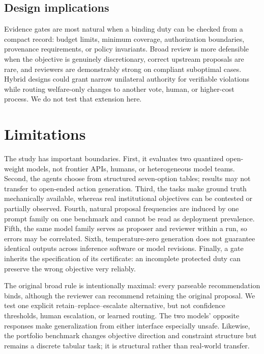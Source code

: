\documentclass[10pt]{article}
\begin{document}
\subsection{Design implications}

Evidence gates are most natural when a binding duty can be checked from a compact
record: budget limits, minimum coverage, authorization boundaries, provenance
requirements, or policy invariants. Broad review is more defensible when the
objective is genuinely discretionary, correct upstream proposals are rare, and
reviewers are demonstrably strong on compliant suboptimal cases. Hybrid designs
could grant narrow unilateral authority for verifiable violations while routing
welfare-only changes to another vote, human, or higher-cost process. We do not
test that extension here.

\section{Limitations}

The study has important boundaries. First, it evaluates two quantized open-weight
models, not frontier APIs, humans, or heterogeneous model teams. Second, the
agents choose from structured seven-option tables; results may not transfer to
open-ended action generation. Third, the tasks make ground truth mechanically
available, whereas real institutional objectives can be contested or partially
observed. Fourth, natural proposal frequencies are induced by one prompt family
on one benchmark and cannot be read as deployment prevalence. Fifth, the same
model family serves as proposer and reviewer within a run, so errors may be
correlated. Sixth, temperature-zero generation does not guarantee identical
outputs across inference software or model revisions. Finally, a gate inherits
the specification of its certificate: an incomplete protected duty can preserve
the wrong objective very reliably.

The original broad rule is intentionally maximal: every parseable recommendation
binds, although the reviewer can recommend retaining the original proposal. We
test one explicit retain--replace--escalate alternative, but not confidence
thresholds, human escalation, or learned routing. The two models' opposite
responses make generalization from either interface especially unsafe. Likewise,
the portfolio benchmark changes objective direction and constraint structure but
remains a discrete tabular task; it is structural rather than real-world
transfer.
\end{document}
